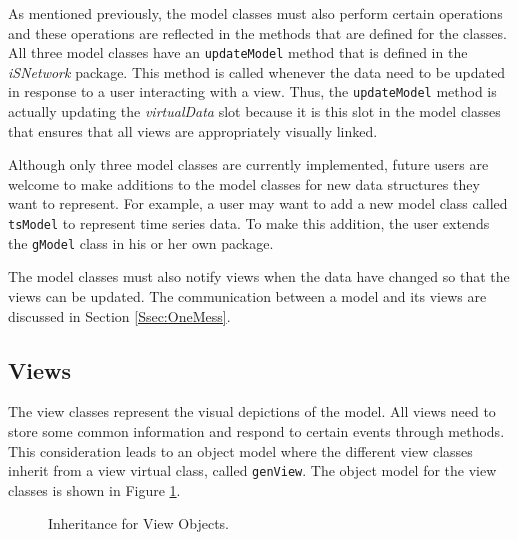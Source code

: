 \documentclass{article}[11pt]
\newcommand{\Rfunction}[1]{{\texttt{#1}}}
\newcommand{\Robject}[1]{{\texttt{#1}}}
\newcommand{\Rpackage}[1]{{\textit{#1}}}
\newcommand{\Rslot}[1]{\textsl{#1}}
\begin{document}
As mentioned previously, the model classes must also perform certain
operations and these operations are reflected in the methods that are defined
for the classes.  All three model classes have an \Rfunction{updateModel}
method that is defined in the \Rpackage{iSNetwork} package.  This method is
called whenever the data need to be updated in response to a user interacting
with a view.  Thus, the \Rfunction{updateModel} method is actually updating the
\Rslot{virtualData} slot because it is this slot in the model classes that
ensures that all views are appropriately visually linked.  

Although only three model classes are currently implemented, future users are
welcome to make additions to the model classes for new data structures they
want to represent.  For example, a user may want to add a new model
class called \Robject{tsModel} to represent time series data.  To make this
addition, the user extends the \Robject{gModel} class in his or her own
package. 

The model classes must also notify views when the data have changed
so that the views can be updated.  The communication between a model and its
views are discussed in Section \ref{Ssec:OneMess}. 

\subsection{Views}\label{Ssec:OneViews}

The view classes represent the visual depictions of the model.  All views
need to store some common information and respond to certain events through
methods.  This consideration leads to an object model where the different view
classes inherit from a view virtual class, called \Robject{genView}.  The
object model for the view classes is shown in Figure \ref{Fig:View}.

\begin{figure}[ht]
  \begin{center}
    \caption{ Inheritance for View Objects. }
    \label{Fig:View}
  \end{center}
\end{figure}
\end{document}
